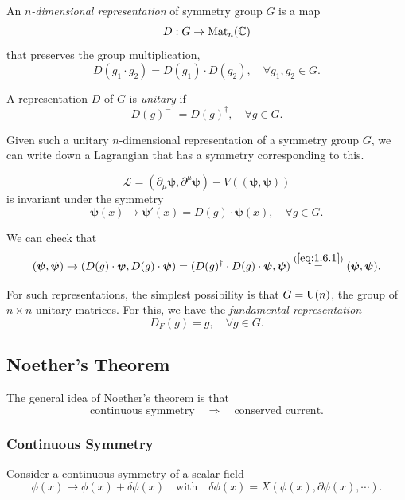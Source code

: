 \documentclass[a4paper,11pt]{article}
\begin{document}
	\begin{defi}
		An \emph{$n$-dimensional representation} of symmetry group $G$ is a map
		\[
			D : G \to \operatorname{Mat}_n(\mathbb{C})
		\]
		that preserves the group multiplication,
		\[
			D(g_1 \cdot g_2) = D(g_1)\cdot D(g_2), \quad \forall g_1, g_2 \in G.
		\]

		A representation $D$ of $G$ is \emph{unitary} if
		\begin{equation}
			D(g)^{-1} = D(g)^\dagger, \quad \forall g \in G.
			\label{eq:1.6.1}
		\end{equation}
	\end{defi}

	Given such a unitary $n$-dimensional representation of a symmetry group $G$, we can write down a Lagrangian that has a symmetry corresponding to this.

	\begin{equation*}
		\mathcal{L} = (\partial_\mu \bm \psi, \partial^\mu \bm \psi) - V((\bm \psi, \bm \psi))
	\end{equation*}
	is invariant under the symmetry
	\begin{equation*}
		\bm \psi (x) \to \bm \psi'(x) = D(g) \cdot \bm \psi(x), \quad \forall g \in G.
	\end{equation*}

	We can check that
	\[
		(\bm \psi, \bm \psi) \to (D(g) \cdot \bm \psi, D(g) \cdot \bm \psi) = (D(g)^\dagger \cdot D(g) \cdot \bm \psi, \bm \psi) \overset{(\ref{eq:1.6.1})}{=} (\bm \psi,\bm \psi).
	\]
	
	For such representations, the simplest possibility is that $G = \operatorname{U}(n)$, the group of $n \times n$ unitary matrices. For this, we have the \emph{fundamental representation}
	\[
		D_F(g) = g, \quad \forall g \in G.
	\]
	
	\subsection{Noether's Theorem}

	The general idea of Noether's theorem is that
	\[
		\text{continuous symmetry} \quad \Rightarrow \quad \text{conserved current}.
	\]

	\subsubsection{Continuous Symmetry}

	Consider a continuous symmetry of a scalar field
	\[
		\phi(x) \to \phi(x) + \delta \phi(x) \quad \text{with} \quad \delta \phi(x) = X(\phi(x), \partial \phi(x), \cdots).
	\]
	
\end{document}

